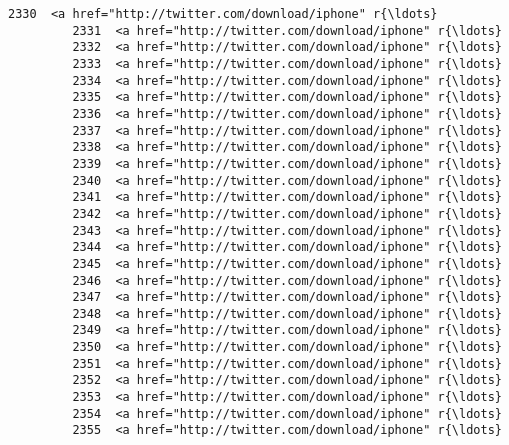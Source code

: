 \documentclass[11pt]{article}
\begin{document}
\begin{Verbatim}[commandchars=\\\{\}]
         2330  <a href="http://twitter.com/download/iphone" r{\ldots}   
         2331  <a href="http://twitter.com/download/iphone" r{\ldots}   
         2332  <a href="http://twitter.com/download/iphone" r{\ldots}   
         2333  <a href="http://twitter.com/download/iphone" r{\ldots}   
         2334  <a href="http://twitter.com/download/iphone" r{\ldots}   
         2335  <a href="http://twitter.com/download/iphone" r{\ldots}   
         2336  <a href="http://twitter.com/download/iphone" r{\ldots}   
         2337  <a href="http://twitter.com/download/iphone" r{\ldots}   
         2338  <a href="http://twitter.com/download/iphone" r{\ldots}   
         2339  <a href="http://twitter.com/download/iphone" r{\ldots}   
         2340  <a href="http://twitter.com/download/iphone" r{\ldots}   
         2341  <a href="http://twitter.com/download/iphone" r{\ldots}   
         2342  <a href="http://twitter.com/download/iphone" r{\ldots}   
         2343  <a href="http://twitter.com/download/iphone" r{\ldots}   
         2344  <a href="http://twitter.com/download/iphone" r{\ldots}   
         2345  <a href="http://twitter.com/download/iphone" r{\ldots}   
         2346  <a href="http://twitter.com/download/iphone" r{\ldots}   
         2347  <a href="http://twitter.com/download/iphone" r{\ldots}   
         2348  <a href="http://twitter.com/download/iphone" r{\ldots}   
         2349  <a href="http://twitter.com/download/iphone" r{\ldots}   
         2350  <a href="http://twitter.com/download/iphone" r{\ldots}   
         2351  <a href="http://twitter.com/download/iphone" r{\ldots}   
         2352  <a href="http://twitter.com/download/iphone" r{\ldots}   
         2353  <a href="http://twitter.com/download/iphone" r{\ldots}   
         2354  <a href="http://twitter.com/download/iphone" r{\ldots}   
         2355  <a href="http://twitter.com/download/iphone" r{\ldots}   
         

\end{Verbatim}
\end{document}
